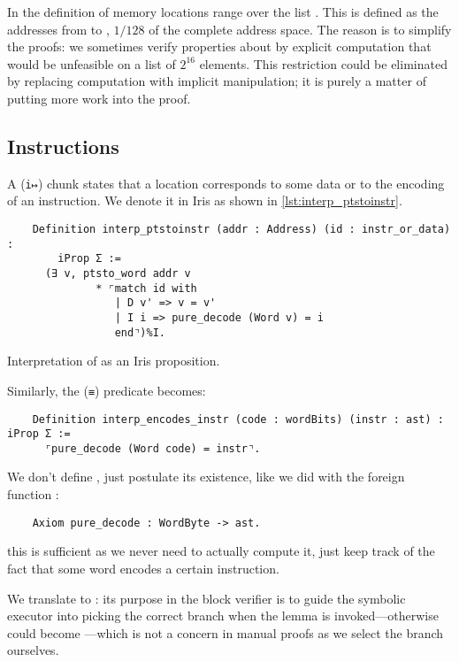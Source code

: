 In the definition of  memory locations range over the list . This is defined as the addresses from  to , \(1/128\) of the complete address space. The reason is to simplify the proofs: we sometimes verify properties about  by explicit computation that would be unfeasible on a list of \(2^{16}\) elements. This restriction could be eliminated by replacing computation with implicit manipulation; it is purely a matter of putting more work into the proof.

\subsection{Instructions}

A  (\texttt{i↦}) chunk states that a location corresponds to some data or to the encoding of an instruction. We denote it in Iris as shown in \cref{lst:interp_ptstoinstr}.

\begin{listing}[t]
  \begin{verbatim}
    Definition interp_ptstoinstr (addr : Address) (id : instr_or_data) :
        iProp Σ :=
      (∃ v, ptsto_word addr v
              * ⌜match id with
                 | D v' => v = v'
                 | I i => pure_decode (Word v) = i
                 end⌝)%I.
  \end{verbatim}
  \caption{Interpretation of  as an Iris proposition.}
  \label{lst:interp_ptstoinstr}
\end{listing}

\pagebreak\noindent
Similarly, the  (\texttt{≡}) predicate becomes:
\begin{verbatim}
    Definition interp_encodes_instr (code : wordBits) (instr : ast) : iProp Σ :=
      ⌜pure_decode (Word code) = instr⌝.
\end{verbatim}

We don't define , just postulate its existence, like we did with the foreign function :
\begin{verbatim}
    Axiom pure_decode : WordByte -> ast.
\end{verbatim}
this is sufficient as we never need to actually compute it, just keep track of the fact that some word encodes a certain instruction.

We translate  to : its purpose in the block verifier is to guide the symbolic executor into picking the correct branch when the  lemma is invoked---otherwise  could become ---which is not a concern in manual proofs as we select the branch ourselves.

